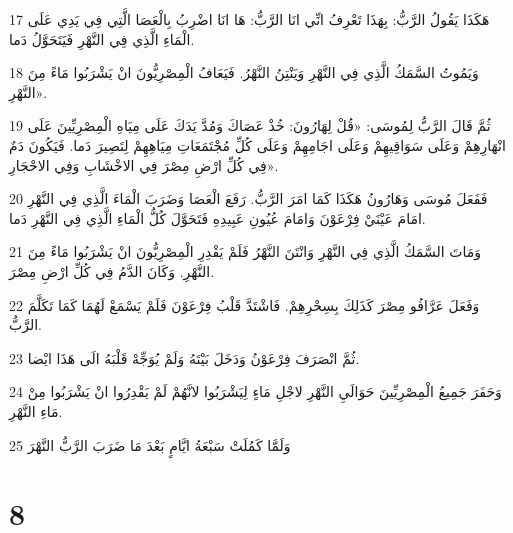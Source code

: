 \par 17 هَكَذَا يَقُولُ الرَّبُّ: بِهَذَا تَعْرِفُ انِّي انَا الرَّبُّ: هَا انَا اضْرِبُ بِالْعَصَا الَّتِي فِي يَدِي عَلَى الْمَاءِ الَّذِي فِي النَّهْرِ فَيَتَحَوَّلُ دَما.
\par 18 وَيَمُوتُ السَّمَكُ الَّذِي فِي النَّهْرِ وَيَنْتِنُ النَّهْرُ. فَيَعَافُ الْمِصْرِيُّونَ انْ يَشْرَبُوا مَاءً مِنَ النَّهْرِ».
\par 19 ثُمَّ قَالَ الرَّبُّ لِمُوسَى: «قُلْ لِهَارُونَ: خُذْ عَصَاكَ وَمُدَّ يَدَكَ عَلَى مِيَاهِ الْمِصْرِيِّينَ عَلَى انْهَارِهِمْ وَعَلَى سَوَاقِيهِمْ وَعَلَى اجَامِهِمْ وَعَلَى كُلِّ مُجْتَمَعَاتِ مِيَاهِهِمْ لِتَصِيرَ دَما. فَيَكُونَ دَمٌ فِي كُلِّ ارْضِ مِصْرَ فِي الاخْشَابِ وَفِي الاحْجَارِ».
\par 20 فَفَعَلَ مُوسَى وَهَارُونُ هَكَذَا كَمَا امَرَ الرَّبُّ. رَفَعَ الْعَصَا وَضَرَبَ الْمَاءَ الَّذِي فِي النَّهْرِ امَامَ عَيْنَيْ فِرْعَوْنَ وَامَامَ عُيُونِ عَبِيدِهِ فَتَحَوَّلَ كُلُّ الْمَاءِ الَّذِي فِي النَّهْرِ دَما.
\par 21 وَمَاتَ السَّمَكُ الَّذِي فِي النَّهْرِ وَانْتَنَ النَّهْرُ فَلَمْ يَقْدِرِ الْمِصْرِيُّونَ انْ يَشْرَبُوا مَاءً مِنَ النَّهْرِ. وَكَانَ الدَّمُ فِي كُلِّ ارْضِ مِصْرَ.
\par 22 وَفَعَلَ عَرَّافُو مِصْرَ كَذَلِكَ بِسِحْرِهِمْ. فَاشْتَدَّ قَلْبُ فِرْعَوْنَ فَلَمْ يَسْمَعْ لَهُمَا كَمَا تَكَلَّمَ الرَّبُّ.
\par 23 ثُمَّ انْصَرَفَ فِرْعَوْنُ وَدَخَلَ بَيْتَهُ وَلَمْ يُوَجِّهْ قَلْبَهُ الَى هَذَا ايْضا.
\par 24 وَحَفَرَ جَمِيعُ الْمِصْرِيِّينَ حَوَالَيِ النَّهْرِ لاجْلِ مَاءٍ لِيَشْرَبُوا لانَّهُمْ لَمْ يَقْدِرُوا انْ يَشْرَبُوا مِنْ مَاءِ النَّهْرِ.
\par 25 وَلَمَّا كَمُلَتْ سَبْعَةُ ايَّامٍ بَعْدَ مَا ضَرَبَ الرَّبُّ النَّهْرَ

\chapter{8}

